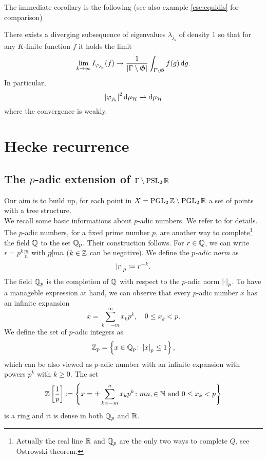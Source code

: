 The immediate corollary is the following (see also example \ref{ese:equidis} for comparison)

\begin{ncor}
There exists a diverging subsequence of eigenvalues $\lambda_{j_{k}}$ of density $1$ so that for any $K$-finite function $f$ it holds the limit
\[
\lim_{k\to\infty}I_{\varphi_{j_{k}}}(f)\to\frac{1}{\left| \Gamma\setminus\mathfrak{G}\right|}\int_{\Gamma\setminus\mathfrak{G}}f(g)\mathop{}\!\mathrm{d} g.
\]
In particular, 
\[
\left| \varphi_{j_{k}}\right|^{2}\mathop{}\!\mathrm{d}\mu_{\mathcal{H}}\rightharpoonup\mathop{}\!\mathrm{d}\mu_{\mathcal{H}}
\]
where the convergence is weakly.
\end{ncor}




\section{Hecke recurrence}

\subsection{The $p$-adic extension of $\Gamma\setminus\operatorname{PSL}_{2}\mathbb{R}$}

\label{sec:p_adic_ext}


Our aim is to build up, for each point in $X=\operatorname{PGL}_{2}\mathbb{Z}\setminus\operatorname{PGL}_{2}\mathbb{R}$ a set of points with a tree structure.\\

We recall some basic informations about $p$-adic numbers. We refer to \cite{Queva:p-adic} for details. The $p$-adic numbers, for a fixed prime number $p$, are another way to complete\footnote{Actually the real line $\mathbb{R}$ and $\mathbb{Q}_{p}$ are the only two ways to complete $Q$, see Ostrowski theorem.} the field $\mathbb{Q}$ to the set $\mathbb{Q}_{p}$. Their construction follows. For $r\in\mathbb{Q}$, we can write $r=p^{k}\frac{m}{n}$ with $p\not|mn$ ($k\in\mathbb{Z}$ can be negative). We define the \emph{$p$-adic norm} as
\[
\left| r\right|_{p}\coloneqq r^{-k}.
\]
The field $\mathbb{Q}_{p}$ is the completion of $\mathbb{Q}$ with respect to the $p$-adic norm $\left| \cdot\right|_{p}$. To have a manageble expression at hand, we can observe that every $p$-adic number $x$ has an infinite expansion
\[
x=\sum_{k=-m}^{\infty}x_{k}p^{k},\quad 0\leq x_{k}<p.
\]
We define the set of $p$-adic integers as
\[
\mathbb{Z}_{p}=\left\{
x\in\mathbb{Q}_{p}\colon\left| x\right|_{p}\leq 1
\right\},
\]
which can be also viewed as $p$-adic number with an infinite expansion with powers $p^{k}$ with $k\geq0$. The set
\[
\mathbb{Z}\left[
\frac{1}{p}\right]\coloneqq\left\{
x=\pm\sum_{k=-m}^{n}x_{k}p^{k}\colon mn,\in\mathbb{N}\text{ and }0\leq x_{k}<p
\right\}
\]
is a ring and it is dense in both $\mathbb{Q}_{p}$ and $\mathbb{R}$.

